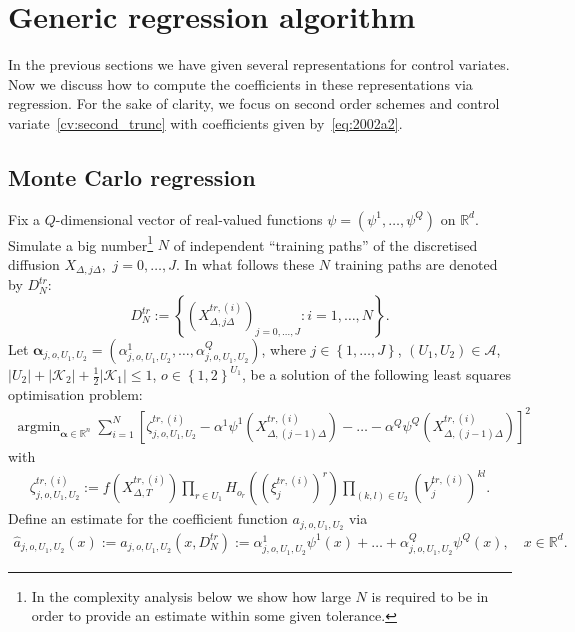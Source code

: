 \documentclass[11pt,a4paper]{amsart}
\theoremstyle{plain}
\theoremstyle{definition}
\theoremstyle{remark}
\numberwithin{equation}{section}
\renewcommand*{\doteq}{:=}
\begin{document}
\section{Generic regression algorithm}
\label{sec:regr}
In the previous sections
we have given several representations
for control variates.
Now we discuss how to compute the coefficients
in these representations via regression.
For the sake of clarity,
we focus on second order schemes
and control variate~\eqref{cv:second_trunc}
with coefficients given by~\eqref{eq:2002a2}.

\subsection{Monte Carlo regression}
Fix a $Q$-dimensional vector of real-valued functions \ensuremath{\psi=(\psi^{1},\ldots,\psi^{Q})}
on \ensuremath{\mathbb{R}^{d}}. Simulate
a big number\footnote{In the complexity analysis below
we show how large $N$ is required to be
in order to provide an estimate within some
given tolerance.}
$N$ of independent  ``training paths'' of the
discretised diffusion $X_{\Delta,j\Delta},$ $j=0,\ldots, J$.
In what follows these $N$ training paths
are denoted by $D_N^{tr}$:
$$
D_N^{tr}\doteq
\left\{
(X_{\Delta,j\Delta}^{tr,(i)})_{j=0,\ldots,J}:
i=1,\ldots,N
\right\}.
$$
Let
$\boldsymbol{\alpha}_{j,o,U_1,U_2}=(
\alpha_{j,o,U_1,U_2}^{1},\ldots,\alpha_{j,o,U_1,U_2}^{Q})$,
where $j\in\left\{1,\ldots, J\right\}$, $(U_1,U_2)\in\mathcal{A}$, $\left|U_2\right|+\left|\mathcal{K}_2\right|+\frac{1}{2}\left|\mathcal{K}_1\right|\le 1$, $o\in\left\{1,2\right\}^{U_1}$,
 be a solution of the following least squares optimisation problem:
\begin{align*}
\operatorname{argmin}_{\boldsymbol{\alpha}\in\mathbb{R}^{n}}
\sum_{i=1}^{N}\left[\zeta^{tr,(i)}_{j,o,U_1,U_2}-\alpha^{1}\psi^{1}(X_{\Delta,(j-1)\Delta}^{tr,(i)})-\ldots-\alpha^{Q}\psi^{Q}(X_{\Delta,(j-1)\Delta}^{tr,(i)})\right]^{2}
\end{align*}
with 
\begin{align*}
\zeta_{j,o,U_1,U_2}^{tr,(i)}\doteq f(X_{\Delta,T}^{tr,(i)})
\prod_{r\in U_1} H_{o_r}\left((\xi_j^{tr,(i)})^r\right)
\prod_{(k,l)\in U_2} (V_j^{tr,(i)})^{kl}.
\end{align*}
Define an estimate for  the coefficient function $a_{j,o,U_1,U_2}$ via
\begin{align*}
\hat a_{j,o,U_1,U_2}(x)\doteq
\hat a_{j,o,U_1,U_2}(x,D_N^{tr})\doteq
\alpha_{j,o,U_1,U_2}^{1}\psi^{1}(x)+\ldots+\alpha_{j,o,U_1,U_2}^{Q}\psi^{Q}(x),\quad x\in\mathbb{R}^{d}.
\end{align*}
\end{document}
